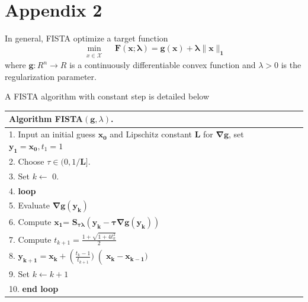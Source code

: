 \documentclass[fleqn]{article}
\begin{document}
\section*{Appendix 2}
\label{sec:appendix2}
In general, FISTA optimize a target function
\begin{equation}\label{eqn: fistatarget}
\min_{\substack{x\in \mathcal{X}}}\quad \mathbf{F(x;\lambda)} = \mathbf{g(x)}+ \mathbf{\lambda \|x\|_1}
\end{equation}
where $\mathbf{g}: R^n \rightarrow R $ is a continuously differentiable convex function and $\lambda > 0$ is the regularization parameter.

A FISTA algorithm with constant step is detailed below\\

\begin{tabular}{l}
\hline
\textbf{Algorithm } FISTA$(\mathbf{g},\lambda)$.\\
\hline
 1. Input an initial guess $\mathbf{x_0}$ and Lipschitz constant $\mathbf{L}$ for $\mathbf{\nabla g}$, set $\mathbf{y_1} = \mathbf{x_0},t_1 = 1$\\
 2. Choose $\tau \in (0,1/\mathbf{L}]$.\\
 3. Set $k \leftarrow$ 0.\\
 4. \textbf{loop}\\
 5. \hspace{10mm}		Evaluate $\mathbf{\nabla g(y_k)}$\\
 6.	\hspace{10mm}	Compute $\mathbf{x_{1}}$= $\mathbf{S_{\tau\lambda}(y_k - \tau\nabla g(y_k))}$\\
 7.	\hspace{10mm}	Compute $t_{k+1} = \frac{1+\sqrt{1 + 4 t_k^2}}{2}$\\
 8.	\hspace{10mm}	$\mathbf{y_{k+1}} = \mathbf{x_k} + \left(\frac{t_k - 1}{t_{k+1}})\right (\mathbf{x_k}-\mathbf{x_{k-1}})$\\
 9.	\hspace{10mm}	Set $k \leftarrow k+1$ \\
 10. \textbf{end loop}\\
\hline
\end{tabular}
\end{document}
